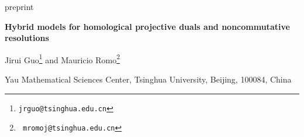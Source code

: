 \documentclass[a4paper,11pt]{article}
\numberwithin{equation}{section}
\begin{document}
\thispagestyle{empty}
\begin{flushright}
preprint
\end{flushright}
\vspace{1cm}
\begin{center}
{\LARGE\bf Hybrid models for homological projective duals and noncommutative 
resolutions} %
\end{center}
\vspace{8mm}
\begin{center}
{\large Jirui Guo\footnote{{\tt jrguo@tsinghua.edu.cn}}  and Mauricio 
Romo\footnote{{\tt 
mromoj@tsinghua.edu.cn}}}
\end{center}
\vspace{6mm}
\begin{center}
Yau Mathematical Sciences Center, Tsinghua University, Beijing, 100084, China
\end{center}
\vspace{15mm}

\begin{abstract}
\noindent
We study hybrid models arising as homological projective duals (HPD) of certain
projective embeddings $f:X\rightarrow\mathbb{P}(V)$ of Fano manifolds $X$. More 
precisely, the category of B-branes of such hybrid models corresponds to the 
HPD category of the embedding $f$. B-branes on these hybrid models can 
be seen as global matrix factorizations over some compact space $B$ or, 
equivalently, as the derived category of the sheaf of $\mathcal{A}$-modules on 
$B$, where  $\mathcal{A}$ is a sheaf of $A_{\infty}$-algebras. This latter 
interpretation corresponds to a noncommutative resolution of $B$. We compute 
explicitly the algebra $\mathcal{A}$ by several methods, for some specific 
class of hybrid models. If the target space of the hybrid model is a global 
orbifold, $\mathcal{A}$ takes the form of a smash product of an 
$A_{\infty}$-algebra with a finite group. However, this is not the case in 
general because the orbifold group can only be defined locally. One needs to 
treat the target space as an algebraic stack in such cases. We apply our results 
to the HPD of $f$ corresponding to a Veronese embedding of projective space and 
the projective embedding of Fano complete intersections in $\mathbb{P}^{n}$.
\end{abstract}
\newpage
\setcounter{tocdepth}{3}
\tableofcontents
\setcounter{footnote}{0}




\end{document}
